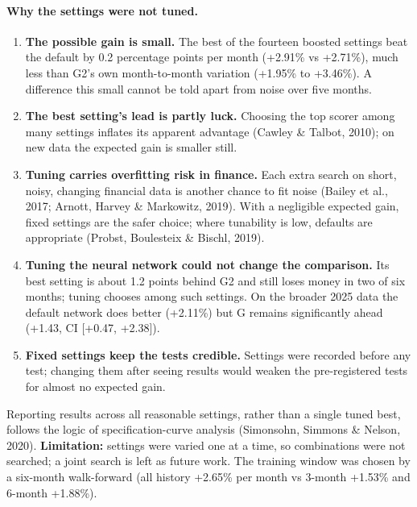 \documentclass[11pt,a4paper]{article}
\begin{document}
\paragraph{Why the settings were not tuned.}
\begin{enumerate}[leftmargin=*]
  \item \textbf{The possible gain is small.} The best of the fourteen boosted settings beat the default by
    0.2 percentage points per month (+2.91\% vs +2.71\%), much less than G2's own month-to-month variation
    (+1.95\% to +3.46\%). A difference this small cannot be told apart from noise over five months.
  \item \textbf{The best setting's lead is partly luck.} Choosing the top scorer among many settings inflates its
    apparent advantage (Cawley \& Talbot, 2010); on new data the expected gain is smaller still.
  \item \textbf{Tuning carries overfitting risk in finance.} Each extra search on short, noisy, changing financial
    data is another chance to fit noise (Bailey et al., 2017; Arnott, Harvey \& Markowitz, 2019). With a negligible
    expected gain, fixed settings are the safer choice; where tunability is low, defaults are appropriate
    (Probst, Boulesteix \& Bischl, 2019).
  \item \textbf{Tuning the neural network could not change the comparison.} Its best setting is about 1.2 points
    behind G2 and still loses money in two of six months; tuning chooses among such settings. On the broader 2025
    data the default network does better (+2.11\%) but G remains significantly ahead (+1.43, CI [+0.47, +2.38]).
  \item \textbf{Fixed settings keep the tests credible.} Settings were recorded before any test; changing them
    after seeing results would weaken the pre-registered tests for almost no expected gain.
\end{enumerate}
Reporting results across all reasonable settings, rather than a single tuned best, follows the logic of
specification-curve analysis (Simonsohn, Simmons \& Nelson, 2020). \textbf{Limitation:} settings were varied one at
a time, so combinations were not searched; a joint search is left as future work. The training window was chosen
by a six-month walk-forward (all history +2.65\% per month vs 3-month +1.53\% and 6-month +1.88\%).
\end{document}
